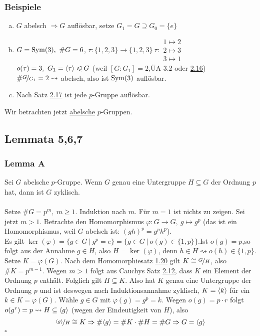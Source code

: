 \subsubsection*{Beispiele}
\begin{enumerate}[(a)]
	\item $G$ abelsch $\Rightarrow G$ auflösbar, setze $G_1=G\supseteq G_0=\{e\}$
	\item $G=\operatorname{Sym}(3),~\#G=6$, $\tau:\{1,2,3\}\to \{1,2,3\}~\tau:\begin{array}{c} 1\mapsto 2\\ 2\mapsto 3\\ 3\mapsto 1 \end{array}$\\
	$o(\tau)=3,~G_1=\langle \tau \rangle\trianglelefteqslant G$ (weil $[G:G_1]=2$,ÜA 3.2 oder \hyperref[sub:satz_8]{2.16})\\
	$\#\nicefrac{G}{G_1}=2\rightsquigarrow$ abelsch, also ist $\operatorname{Sym}(3)$ auflösbar.
	\item Nach Satz \hyperref[sub:lemma_4]{2.17} ist jede $p$-Gruppe auflösbar.
\end{enumerate}

Wir betrachten jetzt \uline{abelsche} $p$-Gruppen.

\subsection{Lemmata 5,6,7}
\label{sub:lemmata}
\subsubsection*{Lemma A}
Sei $G$ abelsche $p$-Gruppe. Wenn $G$ genau eine Untergruppe $H\subseteq G$ der Ordnung $p$ hat, dann ist $G$ zyklisch.\\

\\
Setze $\#G=p^m,~m\ge 1$. Induktion nach $m$. Für $m=1$ ist nichts zu zeigen. Sei jetzt $m>1$. Betrachte den Homomorphismus $\varphi: G\to G,~g\mapsto g^p$ (das ist ein Homomorphismus, weil $G$ abelsch ist: $(gh)^p=g^ph^p$).\\
Es gilt $\ker(\varphi)=\big\{g\in G~|~g^p=e \big\}=\big\{g\in G~|~o(g)\in \{1,p\} \big\}$.Ist $o(g)=p$,so folgt aus der Annahme $g\in H$, also $H=\ker(\varphi)$, denn $h\in H\rightsquigarrow o(h)\in \{1,p\}$.\\
Setze $K=\varphi(G)$. Nach dem Homomorphiesatz \hyperref[sub:der_homomorphiesatz]{1.20} gilt $K\cong \nicefrac{G}{H}$, also $\#K=p^{m-1}$. Wegen $m>1$ folgt aus Cauchys Satz \hyperref[sub:cauchys_satz]{2.12}, dass $K$ ein Element der Ordnung $p$ enthält. Folglich gilt $H\subseteq K$. Also hat $K$ genau eine Untergruppe der Ordnung $p$ und ist deswegen nach Induktionsannahme zyklisch, $K=\langle k \rangle$ für ein $k\in K=\varphi(G)$. Wähle $g\in G$ mit $\varphi(g)=g^p=k$. Wegen $o(g)=p\cdot r$ folgt $o(g^r)=p\rightsquigarrow H\subseteq \langle g \rangle$ (wegen der Eindeutigkeit von $H$), also \[\nicefrac{\langle g \rangle}{H}\cong K\Rightarrow\#\langle g \rangle=\#K\cdot\#H=\#G\Rightarrow G=\langle g \rangle\]
\hfill $\square$

